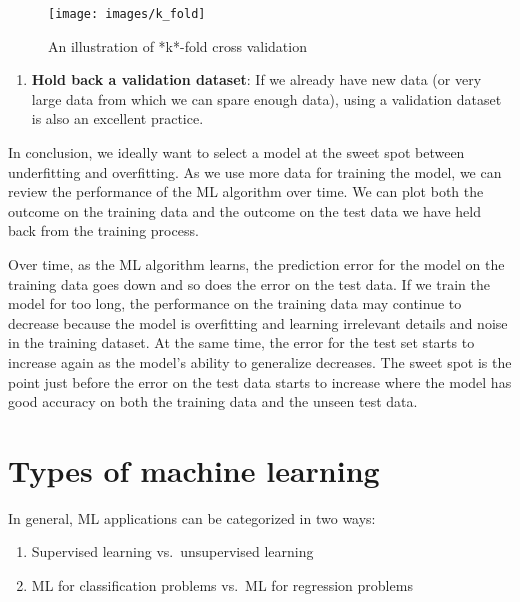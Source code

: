 \documentclass[]{book}
\providecommand{\tightlist}{%
  \setlength{\itemsep}{0pt}\setlength{\parskip}{0pt}}
\begin{document}
\begin{figure}
\texttt{[image: images/k\_fold]} \caption{An illustration of *k*-fold cross validation}\label{fig:fig5-4}
\end{figure}

\begin{enumerate}
\def\labelenumi{\arabic{enumi}.}
\setcounter{enumi}{1}
\tightlist
\item
  \textbf{Hold back a validation dataset}: If we already have new data (or very large data from which we can spare enough data), using a validation dataset is also an excellent practice.
\end{enumerate}

In conclusion, we ideally want to select a model at the sweet spot between underfitting and overfitting. As we use more data for training the model, we can review the performance of the ML algorithm over time. We can plot both the outcome on the training data and the outcome on the test data we have held back from the training process.

Over time, as the ML algorithm learns, the prediction error for the model on the training data goes down and so does the error on the test data. If we train the model for too long, the performance on the training data may continue to decrease because the model is overfitting and learning irrelevant details and noise in the training dataset. At the same time, the error for the test set starts to increase again as the model's ability to generalize decreases. The sweet spot is the point just before the error on the test data starts to increase where the model has good accuracy on both the training data and the unseen test data.

\hypertarget{types-of-machine-learning}{%
\section{Types of machine learning}\label{types-of-machine-learning}}

In general, ML applications can be categorized in two ways:

\begin{enumerate}
\def\labelenumi{\arabic{enumi}.}
\tightlist
\item
  Supervised learning vs.~unsupervised learning
\item
  ML for classification problems vs.~ML for regression problems
\end{enumerate}
\end{document}
